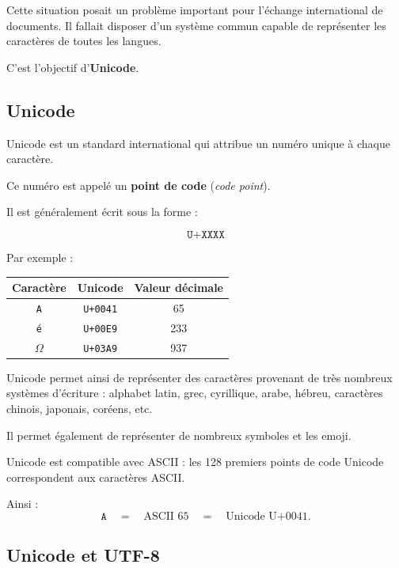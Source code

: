 \documentclass[11pt, a4paper]{book}
\begin{document}
Cette situation posait un problème important pour l'échange international de
documents. Il fallait disposer d'un système commun capable de représenter les
caractères de toutes les langues.

C'est l'objectif d'\textbf{Unicode}.


\subsection{Unicode}

Unicode est un standard international qui attribue un numéro unique à chaque
caractère.

Ce numéro est appelé un \textbf{point de code} (\textit{code point}).

Il est généralement écrit sous la forme :

\[
\texttt{U+XXXX}
\]

Par exemple :

\begin{center}
\renewcommand{\arraystretch}{1.25}
\begin{tabular}{ccc}
\toprule
\textbf{Caractère} & \textbf{Unicode} & \textbf{Valeur décimale} \\
\midrule
\texttt{A} & \texttt{U+0041} & 65 \\
\texttt{é} & \texttt{U+00E9} & 233 \\
$\Omega$   & \texttt{U+03A9} & 937 \\
\bottomrule
\end{tabular}
\end{center}

Unicode permet ainsi de représenter des caractères provenant de très nombreux
systèmes d'écriture : alphabet latin, grec, cyrillique, arabe, hébreu,
caractères chinois, japonais, coréens, etc.

Il permet également de représenter de nombreux symboles et les emoji.

\begin{aretenir}
Unicode est compatible avec ASCII : les 128 premiers points de code Unicode
correspondent aux caractères ASCII.

Ainsi :
\[
\texttt{A}
\quad=\quad
\text{ASCII }65
\quad=\quad
\text{Unicode U+0041}.
\]
\end{aretenir}


\subsection{Unicode et UTF-8}
\end{document}

